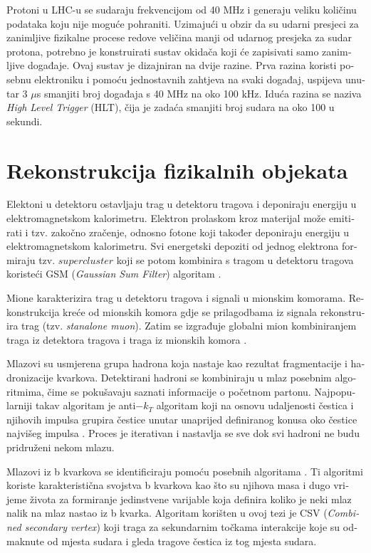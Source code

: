 \begin{otherlanguage}{croatian}
\par Protoni u LHC-u se sudaraju frekvencijom od 40 MHz i generaju veliku količinu podataka koju nije moguće pohraniti. Uzimajući u obzir da su udarni presjeci za zanimljive fizikalne procese redove veličina manji od udarnog presjeka za sudar protona, potrebno je konstruirati sustav okidača koji će zapisivati samo zanimljive događaje. Ovaj sustav je dizajniran na dvije razine. Prva razina koristi posebnu elektroniku i pomoću jednostavnih zahtjeva na svaki događaj, uspijeva unutar 3 $\mu$s smanjiti broj događaja s 40 MHz na oko 100 kHz. Iduća razina se naziva \textit{High Level Trigger} (HLT), čija je zadaća smanjiti broj sudara na oko 100 u sekundi.       

\section{Rekonstrukcija fizikalnih objekata}
\par Elektoni u detektoru ostavljaju trag u detektoru tragova i deponiraju energiju u elektromagnetskom kalorimetru. Elektron prolaskom kroz materijal može emitirati i tzv. zakočno zračenje, odnosno fotone koji također deponiraju energiju u elektromagnetskom kalorimetru. Svi energetski depoziti od jednog elektrona formiraju tzv. $supercluster$ koji se potom kombinira s tragom u detektoru tragova koristeći GSM (\textit{Gaussian Sum Filter}) algoritam \cite{CMS:2010bta,2005JPhG31N9A}.
\par Mione karakterizira trag u detektoru tragova i signali u mionskim komorama. Rekonstrukcija kreće od mionskih komora gdje se prilagodbama iz signala rekonstruira trag (tzv. \textit{stanalone muon}). Zatim se izgrađuje globalni mion kombiniranjem traga iz detektora tragova i traga iz mionskih komora \cite{2012JInst7P0002T,Fruhwirth1987444}.   
\par Mlazovi su usmjerena grupa hadrona koja nastaje kao rezultat fragmentacije i hadronizacije kvarkova. Detektirani hadroni se kombiniraju u mlaz posebnim algoritmima, čime se pokušavaju saznati informacije o početnom partonu. Najpopularniji takav algoritam je anti$-k_T$ algoritam koji na osnovu udaljenosti čestica i njihovih impulsa grupira čestice unutar unaprijed definiranog konusa oko čestice najvišeg impulsa \cite{Cacciari:2008gp}. Proces je iterativan i nastavlja se sve dok svi hadroni ne budu pridruženi nekom mlazu. 
\par Mlazovi iz b kvarkova se identificiraju pomoću posebnih algoritama \cite{Chatrchyan:2012jua}. Ti algoritmi koriste karakteristična svojstva b kvarkova kao što su njihova masa i dugo vrijeme života za formiranje jedinstvene varijable koja definira koliko je neki mlaz nalik na mlaz nastao iz b kvarka. Algoritam korišten u ovoj tezi je CSV (\textit{Combined secondary vertex}) koji traga za sekundarnim točkama interakcije koje su odmaknute od mjesta sudara i gleda tragove čestica iz tog mjesta sudara.

\end{otherlanguage}
